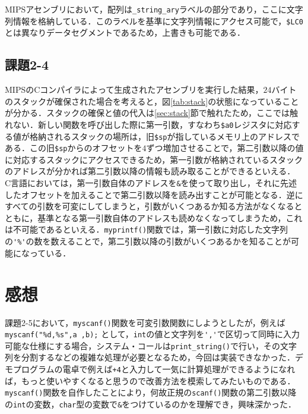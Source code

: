 MIPSアセンブリにおいて，配列は\verb|_string_ary|ラベルの部分であり，ここに文字列情報を格納している．このラベルを基準に文字列情報にアクセス可能で，\verb|$LC0|とは異なりデータセグメントであるため，上書きも可能である．


\subsection{課題2-4}
MIPSのCコンパイラによって生成されたアセンブリを実行した結果，$24$バイトのスタックが確保された場合を考えると，図\ref{tab:stack}の状態になっていることが分かる．スタックの確保と値の代入は\ref{sec:stack}節で触れたため，ここでは触れない．新しい関数を呼び出した際に第一引数，すなわち\verb|$a0|レジスタに対応する値が格納されるスタックの場所は，旧\verb|$sp|が指しているメモリ上のアドレスである．この旧\verb|$sp|からのオフセットを$4$ずつ増加させることで，第二引数以降の値に対応するスタックにアクセスできるため，第一引数が格納されているスタックのアドレスが分かれば第二引数以降の情報も読み取ることができるといえる．%
C言語においては，第一引数自体のアドレスを\verb|&|を使って取り出し，それに先述したオフセットを加えることで第二引数以降を読み出すことが可能となる．逆にすべての引数を可変にしてしまうと，引数がいくつあるか知る方法がなくなるとともに，基準となる第一引数自体のアドレスも読めなくなってしまうため，これは不可能であるといえる．\verb|myprintf()|関数では，第一引数に対応した文字列の\verb|'%'|の数を数えることで，第二引数以降の引数がいくつあるかを知ることが可能になっている．

\section{感想}
課題2-5において，\verb|myscanf()|関数を可変引数関数にしようとしたが，例えば\verb|myscanf("%d,%s",a ,b);|
として，\verb|int|の値と文字列を\verb|','|で区切って同時に入力可能な仕様にする場合，システム・コールは\verb|print_string()|で行い，その文字列を分割するなどの複雑な処理が必要となるため，今回は実装できなかった．デモプログラムの電卓で例えば\verb|+4|と入力して一気に計算処理ができるようになれば，もっと使いやすくなると思うので改善方法を模索してみたいものである．\verb|myscanf()|関数を自作したことにより，何故正規の\verb|scanf()|関数の第二引数以降の\verb|int|の変数，\verb|char|型の変数で\verb|&|をつけているのかを理解でき，興味深かった．

